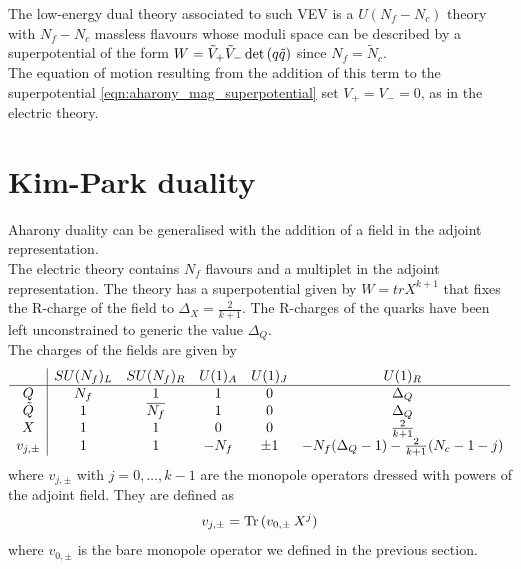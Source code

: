 The low-energy dual theory associated to such VEV is a $U(N_f - N_c)$ theory with $N_f - N_c$ massless flavours whose moduli space can be described by a superpotential of the form $W = \tilde{V}_+ \tilde{V}_- \, \mathrm{det } \,{( q \tilde{q})} $ since $N_f = \tilde{N}_c$.
\\
The equation of motion resulting from the addition of this term to the superpotential \eqref{eqn:aharony_mag_superpotential} set $V_+ = V_-= 0$, as in the electric theory.\\


\section{Kim-Park duality}
Aharony duality can be generalised with the addition of a field in the adjoint representation.\\
The electric theory contains $N_f$ flavours and a multiplet in the adjoint representation. 
The theory has a superpotential given by $W = tr X^{k+1}$ that fixes the R-charge of the field to $\Delta_X = \frac{2}{k+1}$.
The R-charges of the quarks have been left unconstrained to generic the value $\Delta_Q$.\\
The charges of the fields are given by
\begin{equation}
\begin{array}{ c | c c c c c }
  & SU(N_f)_L & SU(N_f)_R & U(1)_A & U(1)_J  & U(1)_R   \\
 \hline
 Q & N_f & 1& 1 & 0   & \Delta_Q  \\  
 \tilde{Q} & 1 & \overline{N_f} & 1 & 0 & \Delta_Q      \\  
  X & 1 & 1  & 0 & 0 & \frac{2}{k+1}  \\ 
 v_{j,\pm} & 1  &1   & - N_f & \pm 1 & -N_f (\Delta_Q-1 ) - \frac{2}{k+1} (N_c-1 - j) \\
\end{array}
\end{equation}
where $v_{j,\pm}$ with $j=0,\dotsc,k-1$ are the monopole operators dressed with powers of the adjoint field. 
They are defined as 
\begin{equation}
v_{j,\pm} = \mathrm{Tr } \,{( v_{0,\pm} \, X^{j})}
\end{equation}
where $v_{0,\pm}$ is the bare monopole operator we defined in the previous section.\\
